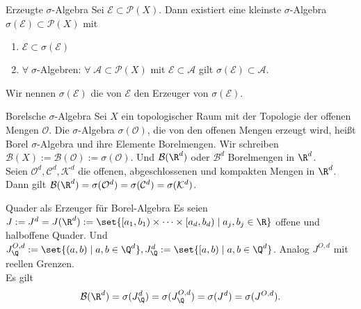 \begin{karte}{Erzeugte \(\sigma\)-Algebra}
	Sei \( \mathcal{E} \subset \mathcal{P}(X) \). Dann existiert eine kleinste \(\sigma\)-Algebra \( \sigma(\mathcal{E}) \subset \mathcal{P}(X) \) mit 
	\begin{enumerate}
		\item \(\mathcal{E} \subset \sigma(\mathcal{E})\)
		\item \(\forall\; \sigma\)-Algebren: \(\forall \; \mathcal{A} \subset \mathcal{P}(X) \) mit \( \mathcal{E} \subset \mathcal{A} \) gilt \(\sigma(\mathcal{E}) \subset \mathcal{A}\).
	\end{enumerate}
	Wir nennen \(\sigma(\mathcal{E})\) die von \(\mathcal{E}\) den Erzeuger von \(\sigma(\mathcal{E})\).
\end{karte}

\begin{karte}{Borelsche \(\sigma\)-Algebra}
	Sei \(X\) ein topologischer Raum mit der Topologie der offenen Mengen \(\mathcal{O}\). 
	Die \(\sigma\)-Algebra \(\sigma(\mathcal{O})\), 
	die von den offenen Mengen erzeugt wird, heißt Borel \(\sigma\)-Algebra und ihre Elemente Borelmengen. 
	Wir schreiben \(\mathcal{B}(X) := \mathcal{B}(\mathcal{O}) := \sigma(\mathcal{O})\). 
	Und \(\mathcal{B}(\R^d)\) oder \(\mathcal{B}^d\) 
	Borelmengen in \(\R^d\).\\
	Seien \( \mathcal{O}^d, \mathcal{C}^d, \mathcal{K}^d \) die offenen, abgeschlossenen und kompakten Mengen in \(\R^d\). 
	Dann gilt \( \mathcal{B}(\R^d) = \sigma(\mathcal{O}^d) = \sigma(\mathcal{C}^d) = \sigma(\mathcal{K}^d) \).
\end{karte}

\begin{karte}{Quader als Erzeuger für Borel-Algebra}
	Es seien \( J := J^d = J(\R^d) := \set{ [a_1,b_1) \times \cdots \times [a_d,b_d) \;|\; a_j, b_j \in \R } \) offene und halboffene Quader.
	Und \( J_\Q^{O,d} := \set{(a,b) \;|\; a,b\in \Q^d}, J_\Q^d := \set{ [a,b) \;|\; a,b\in \Q^d } \). Analog \(J^{O,d}\) mit reellen Grenzen. \\
	Es gilt 
	\[ \mathcal{B}(\R^d) = \sigma(J_\Q^d) = \sigma(J_\Q^{O,d}) = \sigma(J^d) = \sigma(J^{O,d}). \]
\end{karte}